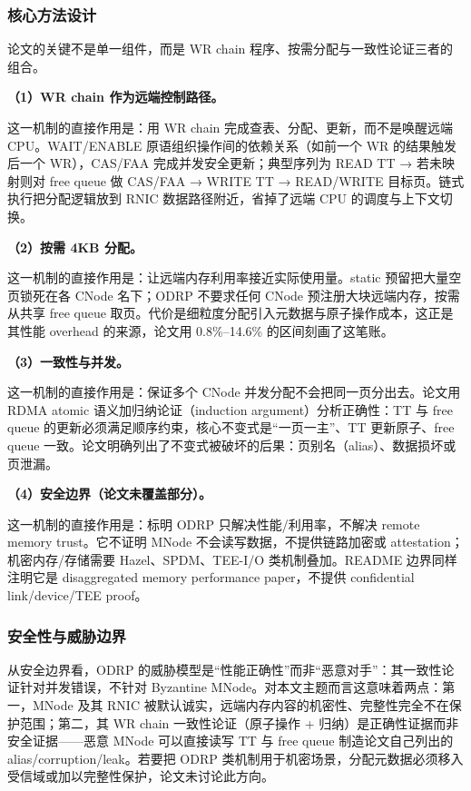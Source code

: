 \documentclass[11pt]{ctexart}
\begin{document}
\subsubsection{核心方法设计}
论文的关键不是单一组件，而是 WR chain 程序、按需分配与一致性论证三者的组合。\par
\noindent\textbf{（1）WR chain 作为远端控制路径。}\par
这一机制的直接作用是：用 WR chain 完成查表、分配、更新，而不是唤醒远端 CPU。WAIT/ENABLE 原语组织操作间的依赖关系（如前一个 WR 的结果触发后一个 WR），CAS/FAA 完成并发安全更新；典型序列为 READ TT → 若未映射则对 free queue 做 CAS/FAA → WRITE TT → READ/WRITE 目标页。链式执行把分配逻辑放到 RNIC 数据路径附近，省掉了远端 CPU 的调度与上下文切换。\par
\noindent\textbf{（2）按需 4KB 分配。}\par
这一机制的直接作用是：让远端内存利用率接近实际使用量。static 预留把大量空页锁死在各 CNode 名下；ODRP 不要求任何 CNode 预注册大块远端内存，按需从共享 free queue 取页。代价是细粒度分配引入元数据与原子操作成本，这正是其性能 overhead 的来源，论文用 0.8\%--14.6\% 的区间刻画了这笔账。\par
\noindent\textbf{（3）一致性与并发。}\par
这一机制的直接作用是：保证多个 CNode 并发分配不会把同一页分出去。论文用 RDMA atomic 语义加归纳论证（induction argument）分析正确性：TT 与 free queue 的更新必须满足顺序约束，核心不变式是“一页一主”、TT 更新原子、free queue 一致。论文明确列出了不变式被破坏的后果：页别名（alias）、数据损坏或页泄漏。\par
\noindent\textbf{（4）安全边界（论文未覆盖部分）。}\par
这一机制的直接作用是：标明 ODRP 只解决性能/利用率，不解决 remote memory trust。它不证明 MNode 不会读写数据，不提供链路加密或 attestation；机密内存/存储需要 Hazel、SPDM、TEE-I/O 类机制叠加。README 边界同样注明它是 disaggregated memory performance paper，不提供 confidential link/device/TEE proof。\par
\subsubsection{安全性与威胁边界}
从安全边界看，ODRP 的威胁模型是“性能正确性”而非“恶意对手”：其一致性论证针对并发错误，不针对 Byzantine MNode。对本文主题而言这意味着两点：第一，MNode 及其 RNIC 被默认诚实，远端内存内容的机密性、完整性完全不在保护范围；第二，其 WR chain 一致性论证（原子操作 + 归纳）是正确性证据而非安全证据——恶意 MNode 可以直接读写 TT 与 free queue 制造论文自己列出的 alias/corruption/leak。若要把 ODRP 类机制用于机密场景，分配元数据必须移入受信域或加以完整性保护，论文未讨论此方向。\par
\end{document}
